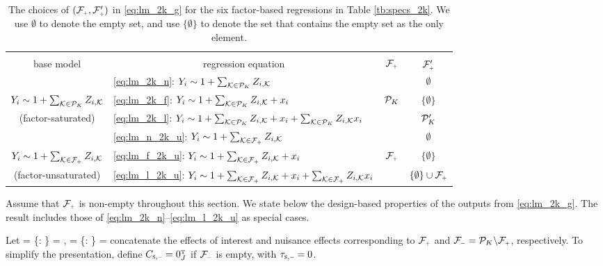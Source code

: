 \documentclass[11pt]{article}
\theoremstyle{definition}
\begin{document}
\begin{table}[t]
\renewcommand{\arraystretch}{1.3}
\caption{\label{tb:specs_2k_app}  The choices of $(\mfp, \mfp')$ in \eqref{eq:lm_2k_g} for the six factor-based regressions in Table \ref{tb:specs_2k}.  
We use $\emptyset$ to denote the empty set, and use $\{\emptyset\}$ to denote the set that contains the empty set as the only element. }
\begin{center}
 
\begin{tabular}{|c|l|c|c|}\hline
  & & &\\
base model & \multicolumn{1}{c|}{regression equation} & $\mfp$ & $\mfp'$  \\\hline
&\eqref{eq:lm_2k_n}: $Y_i \sim 1 + \sum_{\mathcal{K} \in \mathcal P_K} Z_{i, \mathcal{K}}$ &   & $\emptyset$      \\\cline{2-2}\cline{4-4}
$Y_i \sim 1 + \sum_{\mathcal{K} \in \mathcal P_K} Z_{i, \mathcal{K}}$ &\eqref{eq:lm_2k_f}: $Y_i \sim 1 + \sum_{\mathcal{K} \in \mathcal P_K} Z_{i, \mathcal{K}}+ x_i $  & $\mathcal P_K$ & $\{\emptyset\}$      \\\cline{2-2}\cline{4-4}
(factor-saturated) &\eqref{eq:lm_2k_l}: $Y_i \sim 1 + \sum_{\mathcal{K} \in \mathcal P_K} Z_{i, \mathcal{K}} + x_i  + \sum_{\mathcal{K} \in \mathcal P_K} Z_{i, \mathcal{K}} x_i  $&   & $\mathcal P_K'$  \\\hline
& \eqref{eq:lm_n_2k_u}: $Y_i \sim 1 + \sum_{\mk \in \mfp} \zimks$ &     & $\emptyset$  \\\cline{2-2}\cline{4-4}
{$Y_i \sim 1 + \sum_{\mk \in \mfp} \zimks$}&\eqref{eq:lm_f_2k_u}: $Y_i \sim 1 + \sum_{\mk \in \mfp} \zimks+\cxi $ & $\mfp$   & $\{\emptyset\}$  \\\cline{2-2}\cline{4-4}
(factor-unsaturated) & \eqref{eq:lm_l_2k_u}: $Y_i \sim 1 + \sum_{\mk \in \mfp} \zimks + \cxi  + \sum_{\mk \in \mfp} \zimks \cxi   $ &     & $\{\emptyset\} \cup \mfp$  \\\hline
\end{tabular}		

\end{center}
\end{table}


Assume that $\mfp$ is non-empty throughout this section. We state below the design-based properties of the \olss outputs from \eqref{eq:lm_2k_g}. The result includes those of   \eqref{eq:lm_2k_n}--\eqref{eq:lm_l_2k_u} as special cases. 


Let
\begina
\tsp   = \{\tsmk   : \mk \in \mfp \} = \csp\by, \qquad
\tsm = \{\tmk : \mk\in\mfm \} = \csm \by
\enda
concatenate the effects of interest and nuisance effects corresponding to $\mfp$ and $\mfm = \pk \backslash \mfp$, respectively.
To simplify the presentation, define $\csm = 0_J^\T$ if $\mfm$ is empty, with $\tsm = 0$. 
\end{document}
